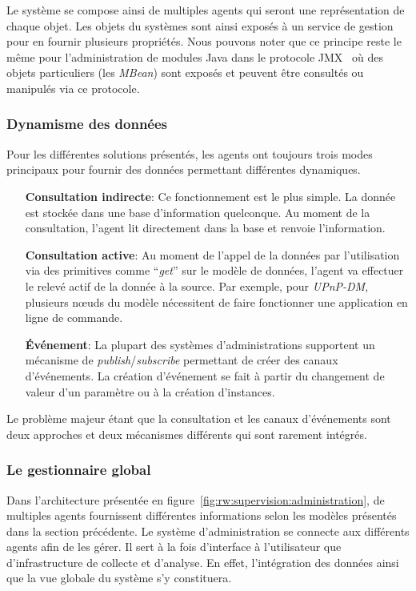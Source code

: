 Le système se compose ainsi de multiples agents qui seront une représentation de chaque objet. Les objets du systèmes sont ainsi exposés à un service de gestion pour en fournir plusieurs propriétés. Nous pouvons noter que ce principe reste le même pour l'administration de modules Java dans le protocole JMX~\cite{Sun:JMX} où des objets particuliers (les \textit{MBean}) sont exposés et peuvent être consultés ou manipulés via ce protocole.

\subsubsection{Dynamisme des données}
Pour les différentes solutions présentés, les agents ont toujours trois modes principaux pour fournir des données permettant différentes dynamiques.
\begin{itemize}
	\item[\textbf{Consultation indirecte}: ] Ce fonctionnement est le plus simple. La donnée est stockée dans une base d'information quelconque. Au moment de la consultation, l'agent lit directement dans la base et renvoie l'information.
	\item[\textbf{Consultation active}: ] Au moment de l'appel de la données par l'utilisation via des primitives comme \enquote{\it get} sur le modèle de données, l'agent va effectuer le relevé actif de la donnée à la source. Par exemple, pour \textit{UPnP-DM}, plusieurs nœuds du modèle nécessitent de faire fonctionner une application en ligne de commande.
	\item[\textbf{Événement}: ] La plupart des systèmes d'administrations supportent un mécanisme de \textit{publish}/\textit{subscribe} permettant de créer des canaux d'événements. La création d'événement se fait à partir du changement de valeur d'un paramètre ou à la création d'instances.
\end{itemize}

Le problème majeur étant que la consultation et les canaux d'événements sont deux approches et deux mécanismes différents qui sont rarement intégrés.

\subsubsection{Le gestionnaire global}
Dans l'architecture présentée en figure~\ref{fig:rw:supervision:administration}, de multiples agents fournissent différentes informations selon les modèles présentés dans la section précédente. Le système d'administration se connecte aux différents agents afin de les gérer. Il sert à la fois d'interface à l'utilisateur que d'infrastructure de collecte et d'analyse. En effet, l'intégration des données ainsi que la vue globale du système s'y constituera.

